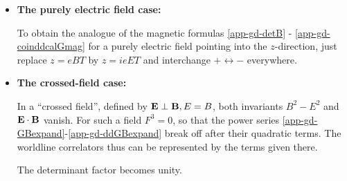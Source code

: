 \documentclass[a4paper,11pt]{article}
\begin{document}
\begin{itemize}
We let the magnetic field point along the positive $z$-axis and denote $z=eBT$.
Then the determinant factor \eqref{app-gd-detP} becomes
%
\bear
{\rm det}^{-{1}}
&=&
{z} 
\, .
\label{app-gd-detB}
\ear
The decompositions 
\eqref{app-gd-specialdecompcalSAfirst} - \eqref{app-gd-specialdecompcalSAlast} 
now involve only the three matrices $g_+$, $g_-$ and $r_+$:
%
\begin{eqnarray}
{\cal G}_{B}(\tau_1,\tau_2) 
&=&G_{B12}\,{g_-}
-{T\over 2z}
A_{B12}(z)
{g_+}
+{T\over{2z}}\Bigl(S_{B12}(z)
-\dot G_{B12}\Bigr)i{r_+}\, ,  \quad \\
\dot{\cal G}_{B}(\tau_1,\tau_2)
&=&\dot G_{B12}\,{g_-}+ S_{B12}(z)g_+ -A_{B12}(z) i{r_+}\, , \\
\ddot{\cal G}_{B}(\tau_1,\tau_2)
&=& \ddot G_{B12}\Eins -\frac{2z}{T} A_{B12}(z)g_+
+ \frac{2z}{T} S_{B12}(z) i r_+ \;.
\label{D-Gddmag}
\ear
The coincidence limits \eqref{app-gd-coincalGB} - \eqref{app-gd-coinddcalGB} turn into
%
\begin{eqnarray}
{\cal G}_B(\tau,\tau) &=& 
-\frac{T}{6}\, {g_-}
-{T\over 2z}
\biggl({\coth }\, z- \frac{1}{z}\biggr)
{g_+}
=
-\frac{T}{6}\Eins -{T\over 2z}
\biggl({\coth} \, z- \frac{1}{z}-\frac{z}{3} \biggr)
{g_+}
\, ,
\nonumber\\
\\
\dot {\cal G}_B(\tau,\tau) &=& - \biggl({\coth }\, z- \frac{1}{z}\biggr)
i{r_+}\, ,\\
\ddot {\cal G}_B(\tau,\tau) &=& 
2\Bigl(\delta (0) - \frac{1}{T}\Bigr)\Eins
-\frac{2z}{T} \biggl({\coth} \, z- \frac{1}{z}\biggr) g_+ \;.
\label{app-gd-coinddcalGmag}
\end{eqnarray}

\item
{\bf The purely electric field case:}

To obtain the analogue of the magnetic formulas \eqref{app-gd-detB} - \eqref{app-gd-coinddcalGmag} for a purely electric field pointing into the $z$-direction, just replace $z=eBT$ by $z=ieET$ and 
interchange $+ \leftrightarrow -$ everywhere. 

\item
{\bf The crossed-field case:}

In a ``crossed field'', defined by 
${\bf E}\perp{\bf B}, E=B$, both invariants 
$B^2-E^2$ and ${\bf E}\cdot{\bf B}$
vanish. For such a field $F^3 =0$, so that the power series 
\eqref{app-gd-GBexpand}-\eqref{app-gd-ddGBexpand}
break off after their quadratic terms.
The worldline correlators thus can be represented by the terms given there. 

\noindent
The determinant factor becomes unity.

\end{itemize}
\end{document}
